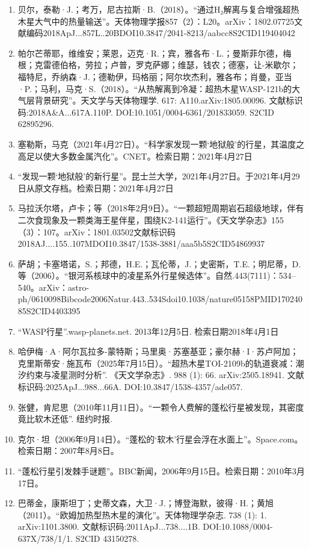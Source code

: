 \begin{enumerate}
\item 贝尔，泰勒·J.；考万，尼古拉斯·B.（2018）。“通过H₂解离与复合增强超热木星大气中的热量输送”。天体物理学报857（2）：L20。arXiv：1802.07725文献编码2018ApJ...857L..20BDOI10.3847/2041-8213/aabcc8S2CID119404042
\item 帕尔芒蒂耶，维维安；莱恩，迈克·R.；宾，雅各布·L.；曼斯菲尔德，梅根；克雷德伯格，劳拉；卢普，罗克萨娜；维瑟，钱农；德塞，让-米歇尔；福特尼，乔纳森·J.；德勒伊，玛格丽；阿尔坎杰利，雅各布；肖曼，亚当·P.；马利，马克·S.（2018）。“从热解离到冷凝：超热木星WASP-121b的大气层背景研究”。天文学与天体物理学. 617: A110.arXiv:1805.00096. 文献标识码:2018A&A...617A.110P. DOI:10.1051/0004-6361/201833059. S2CID 62895296.
\item 塞勒斯，马克（2021年4月27日）。“科学家发现一颗‘地狱般’的行星，其温度之高足以使大多数金属汽化”。CNET。检索日期：2021年4月27日
\item “发现一颗‘地狱般’的新行星”。昆士兰大学，2021年4月27日。于2021年4月29日从原文存档。检索日期：2021年4月27日
\item 马拉沃尔塔，卢卡；等（2018年2月9日）。“一颗超短周期岩石超级地球，伴有二次食现象及一颗类海王星伴星，围绕K2-141运行”。《天文学杂志》155（3）：107。arXiv：1801.03502文献标识码2018AJ....155..107MDOI10.3847/1538-3881/aaa5b5S2CID54869937
\item 萨胡；卡塞塔诺，S.；邦德，H.E.；瓦伦蒂，J.；史密斯，T.E.；明尼蒂，D.等（2006）。“银河系核球中的凌星系外行星候选体”。自然.443(7111)：534–540。arXiv：astro-ph/0610098Bibcode2006Natur.443..534Sdoi10.1038/nature05158PMID17024085S2CID4403395
\item “WASP行星”.wasp-planets.net. 2013年12月5日. 检索日期2018年4月1日
\item 哈伊梅·A·阿尔瓦拉多-蒙特斯；马里奥·苏塞基亚；豪尔赫·I·苏卢阿加；克里斯蒂安·施瓦布（2025年7月15日）。“超热木星TOI-2109b的轨道衰减：潮汐约束与凌星测时分析”. 《天文学杂志》. 988 (1): 66. arXiv:2505.18941. 文献标识码:2025ApJ...988...66A. DOI:10.3847/1538-4357/ade057.
\item 张健，肯尼思（2010年11月11日）。“一颗令人费解的蓬松行星被发现，其密度竟比软木还低”. 纽约时报.
\item 克尔·坦（2006年9月14日）。“蓬松的‘软木’行星会浮在水面上”。Space.com。检索日期：2007年8月8日。
\item “蓬松行星引发棘手谜题”。BBC新闻，2006年9月15日。检索日期：2010年3月17日。
\item 巴蒂金，康斯坦丁；史蒂文森，大卫·J.；博登海默，彼得·H.；黄旭（2011）。“欧姆加热型热木星的演化”。天体物理学杂志. 738 (1): 1. arXiv:1101.3800. 文献标识码:2011ApJ...738....1B. DOI:10.1088/0004-637X/738/1/1. S2CID 43150278.

\end{enumerate}
